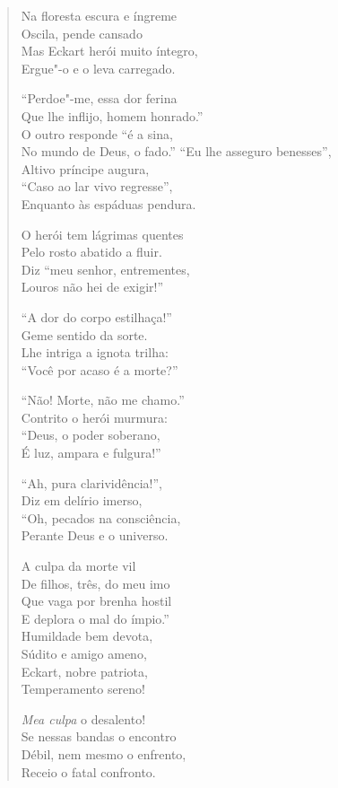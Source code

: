 \begin{verse}
Na floresta escura e íngreme\\
Oscila, pende cansado\\
Mas Eckart  herói muito íntegro,\\
Ergue"-o e o leva carregado.

``Perdoe"-me, essa dor ferina\\
Que lhe inflijo, homem honrado.''\\
O outro responde ``é a sina,\\
No mundo de Deus, o fado.''
\pagebreak
``Eu lhe asseguro benesses'',\\
Altivo príncipe augura,\\
``Caso ao lar vivo regresse'',\\
Enquanto às espáduas pendura.

O herói tem lágrimas quentes\\
Pelo rosto abatido a fluir.\\
Diz ``meu senhor, entrementes,\\
Louros não hei de exigir!''

``A dor do corpo estilhaça!''\\
Geme sentido da sorte.\\
Lhe intriga a ignota trilha:\\
``Você por acaso é a morte?''

``Não! Morte, não me chamo.''\\
Contrito o herói murmura:\\
``Deus, o poder soberano,\\
É luz, ampara e fulgura!''

``Ah, pura clarividência!'',\\
Diz em delírio imerso,\\
``Oh, pecados na consciência,\\
Perante Deus e o universo.

A culpa da morte vil\\
De filhos, três, do meu imo\\
Que vaga por brenha hostil\\
E deplora o mal do ímpio.''\\
 
Humildade bem devota,\\
Súdito e amigo ameno,\\
Eckart, nobre patriota,\\
Temperamento sereno! 

\textit{Mea culpa} o desalento!\\
Se nessas bandas o encontro\\
Débil, nem mesmo o enfrento,\\
Receio o fatal confronto.


\end{verse}
